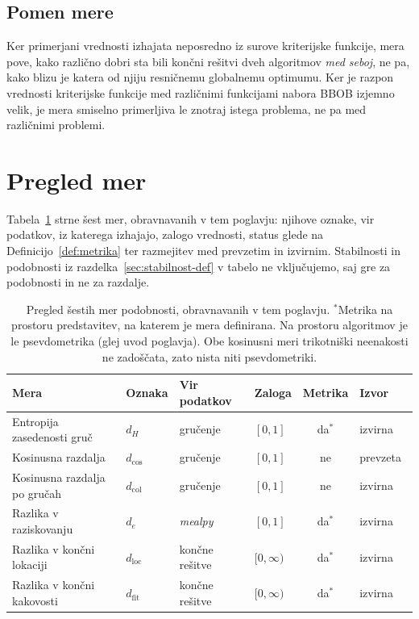 \documentclass[a4paper, 12pt]{book}
\begin{document}
\subsection{Pomen mere}

Ker primerjani vrednosti izhajata neposredno iz surove kriterijske funkcije,
mera pove, kako različno dobri sta bili končni rešitvi dveh algoritmov
\emph{med seboj}, ne pa, kako blizu je katera od njiju resničnemu
globalnemu optimumu. Ker je razpon vrednosti kriterijske funkcije med
različnimi funkcijami nabora BBOB izjemno velik, je mera smiselno
primerljiva le znotraj istega problema, ne pa med različnimi problemi.

\clearpage

\section{Pregled mer}
\label{sec:pregled-mer}

Tabela~\ref{tab:pregled-mer} strne šest mer, obravnavanih v tem poglavju:
njihove oznake, vir podatkov, iz katerega izhajajo, zalogo vrednosti, status
glede na Definicijo~\ref{def:metrika} ter razmejitev med prevzetim in
izvirnim. Stabilnosti in podobnosti iz razdelka~\ref{sec:stabilnost-def} v
tabelo ne vključujemo, saj gre za podobnosti in ne za razdalje.

\begin{table}[H]
\centering
\small
\setlength{\tabcolsep}{4pt}
\begin{tabular}{@{}llllcl@{}}
\toprule
{\bf Mera} & {\bf Oznaka} & {\bf Vir podatkov} & {\bf Zaloga} & {\bf Metrika} & {\bf Izvor} \\
\midrule
Entropija zasedenosti gruč    & $d_H$              & gručenje       & $[0,1]$      & da$^{*}$ & izvirna \\
Kosinusna razdalja            & $d_{\cos}$         & gručenje       & $[0,1]$      & ne       & prevzeta~\cite{clustopt2025} \\
Kosinusna razdalja po gručah  & $d_{\mathrm{col}}$ & gručenje       & $[0,1]$      & ne       & izvirna \\
Razlika v raziskovanju        & $d_e$              & \emph{mealpy}         & $[0,1]$      & da$^{*}$ & izvirna \\
Razlika v končni lokaciji     & $d_{\mathrm{loc}}$ & končne rešitve & $[0,\infty)$ & da$^{*}$ & izvirna \\
Razlika v končni kakovosti    & $d_{\mathrm{fit}}$ & končne rešitve & $[0,\infty)$ & da$^{*}$ & izvirna \\
\bottomrule
\end{tabular}
\caption{Pregled šestih mer podobnosti, obravnavanih v tem poglavju.
$^{*}$Metrika na prostoru predstavitev, na katerem je mera definirana. Na
prostoru algoritmov je le psevdometrika (glej uvod poglavja). Obe kosinusni
meri trikotniški neenakosti ne zadoščata, zato nista niti psevdometriki.}
\label{tab:pregled-mer}
\end{table}
\end{document}
